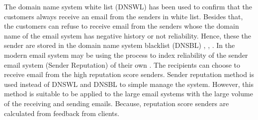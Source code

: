 \documentclass[conference]{IEEEtran}
\begin{document}
The domain name system white list (DNSWL) \cite{levine} has been used to confirm that the customers always receive an email from the senders in white list.
Besides that, the customers can refuse to receive email from the senders whose the domain name of the email system has negative history or not reliability. 
Hence, these the sender are stored in the domain name system blacklist (DNSBL) \cite{levine}, \cite{Sochor}, \cite{Lazzari}.
In the modern email system may be using the process to index reliability of the sender email system (Sender Reputation) of their own \cite{DBLP:taylor}. 
The recipients can choose to receive email
from the high reputation score senders.
Sender reputation method is used instead of DNSWL and DNSBL to simple manage the system.
However, this method is suitable to be applied to the large email systems with the large volume of the receiving and sending emails.
Because, reputation score senders are calculated from feedback from clients.
\end{document}
